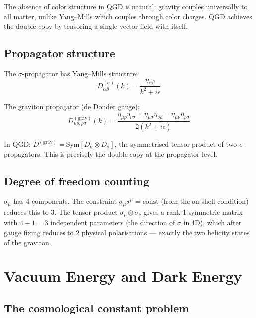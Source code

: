 \documentclass[11pt,a4paper]{article}
\theoremstyle{plain}
\theoremstyle{definition}
\theoremstyle{remark}
\begin{document}
The absence of color structure in QGD is natural: gravity couples universally to all matter, unlike Yang--Mills which couples through color charges.  QGD achieves the double copy by tensoring a single vector field with itself.

\subsection{Propagator structure}

The $\sigma$-propagator has Yang--Mills structure:
\begin{equation}
  D_{\alpha\beta}^{(\sigma)}(k) = \frac{\eta_{\alpha\beta}}{k^2 + i\epsilon}
\end{equation}

The graviton propagator (de Donder gauge):
\begin{equation}
  D_{\mu\nu,\rho\sigma}^{(\mathrm{grav})}(k) = \frac{\eta_{\mu\rho}\eta_{\nu\sigma} + \eta_{\mu\sigma}\eta_{\nu\rho} - \eta_{\mu\nu}\eta_{\rho\sigma}}{2(k^2+i\epsilon)}
\end{equation}

In QGD: $D^{(\mathrm{grav})} = \mathrm{Sym}[D_\sigma\otimes D_\sigma]$, the symmetrised tensor product of two $\sigma$-propagators.  This is precisely the double copy at the propagator level.

\subsection{Degree of freedom counting}

$\sigma_\mu$ has 4 components.  The constraint $\sigma_\mu\sigma^\mu = \mathrm{const}$ (from the on-shell condition) reduces this to 3.  The tensor product $\sigma_\mu\otimes\sigma_\nu$ gives a rank-1 symmetric matrix with $4-1 = 3$ independent parameters (the direction of $\sigma$ in 4D), which after gauge fixing reduces to 2 physical polarisations --- exactly the two helicity states of the graviton.

\section{Vacuum Energy and Dark Energy}
\label{sec:vacuum}

\subsection{The cosmological constant problem}
\end{document}
